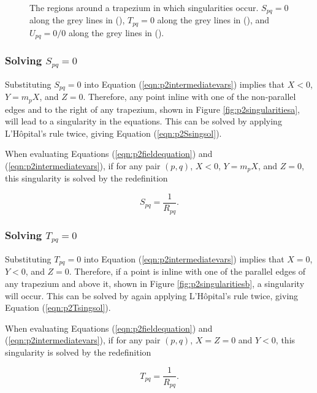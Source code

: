 \begin{figure}
	\centering
	
	\caption{The regions around a trapezium in which singularities occur. \(S_{\!pq} = 0\) along the grey lines in (), \(T_{pq} = 0\) along the grey lines in (), and \(U_{pq} = 0/0\) along the grey lines in ().}
	\label{fig:p2singularities}
\end{figure}

\subsubsection{Solving \(S_{\!pq} = 0\)}

Substituting \(S_{\!pq} = 0\) into Equation (\ref{eqn:p2intermediatevars}) implies that \(X < 0\), \(Y = m_pX\), and \(Z = 0\). Therefore, any point inline with one of the non-parallel edges and to the right of any trapezium, shown in Figure \ref{fig:p2singularitiesa}, will lead to a singularity in the equations. This can be solved by applying L'H\^{o}pital's rule twice, giving Equation (\ref{eqn:p2Ssingsol}).

When evaluating Equations (\ref{eqn:p2fieldequation}) and (\ref{eqn:p2intermediatevars}), if for any pair \(\left(p,q\right)\), \(X < 0\), \(Y = m_pX\), and \(Z = 0\), this singularity is solved by the redefinition

\begin{equation}\label{eqn:p2Ssingsol}
S_{\!pq} = \frac{1}{R_{pq}} \text{.}
\end{equation}

\subsubsection{Solving \(T_{pq} = 0\)}

Substituting \(T_{pq} = 0\) into Equation (\ref{eqn:p2intermediatevars}) implies that \(X = 0\), \(Y < 0\), and \(Z = 0\). Therefore, if a point is inline with one of the parallel edges of any trapezium and above it, shown in Figure \ref{fig:p2singularitiesb}, a singularity will occur. This can be solved by again applying L'H\^{o}pital's rule twice, giving Equation (\ref{eqn:p2Tsingsol}).

When evaluating Equations (\ref{eqn:p2fieldequation}) and (\ref{eqn:p2intermediatevars}), if for any pair \(\left(p,q\right)\), \(X = Z = 0\) and \(Y < 0\), this singularity is solved by the redefinition

\begin{equation}\label{eqn:p2Tsingsol}
T_{pq} = \frac{1}{R_{pq}} \text{.}
\end{equation}

